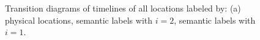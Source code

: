 \begin{figure}[t]
    \centering
    \caption{Transition diagrams of timelines of all locations labeled by: (a)
        physical locations, semantic labels with $i=2$, semantic labels with
        $i=1$.}
\end{figure}
